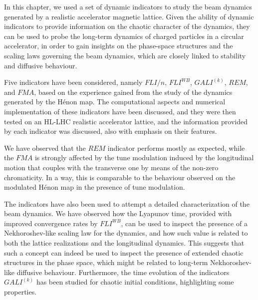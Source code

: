 In this chapter, we used a set of dynamic indicators to study the beam dynamics generated by a realistic accelerator magnetic lattice. Given the ability of dynamic indicators to provide information on the chaotic character of the dynamics, they can be used to probe the long-term dynamics of charged particles in a circular accelerator, in order to gain insights on the phase-space structures and the scaling laws governing the beam dynamics, which are closely linked to stability and diffusive behaviour.

Five indicators have been considered, namely $FLI/n$, $FLI^{WB}$, $GALI^{(k)}$, $REM$, and $FMA$, based on the experience gained from the study of the dynamics generated by the H\'enon map. The computational aspects and numerical implementation of these indicators have been discussed, and they were then tested on an HL-LHC realistic accelerator lattice, and the information provided by each indicator was discussed, also with emphasis on their features.

We have observed that the $REM$ indicator performs mostly as expected, while the $FMA$ is strongly affected by the tune modulation induced by the longitudinal motion that couples with the transverse one by means of the non-zero chromaticity. In a way, this is comparable to the behaviour observed on the modulated Hénon map in the presence of tune modulation. 

The indicators have also been used to attempt a detailed characterization of the beam dynamics. We have observed how the Lyapunov time, provided with improved convergence rates by $FLI^{WB}$, can be used to inspect the presence of a Nekhoroshev-like scaling law for the dynamics, and how such value is related to both the lattice realizations and the longitudinal dynamics. This suggests that such a concept can indeed be used to inspect the presence of extended chaotic structures in the phase space, which might be related to long-term Nekhoroshev-like diffusive behaviour. Furthermore, the time evolution of the indicators $GALI^{(k)}$ has been studied for chaotic initial conditions, highlighting some properties.
